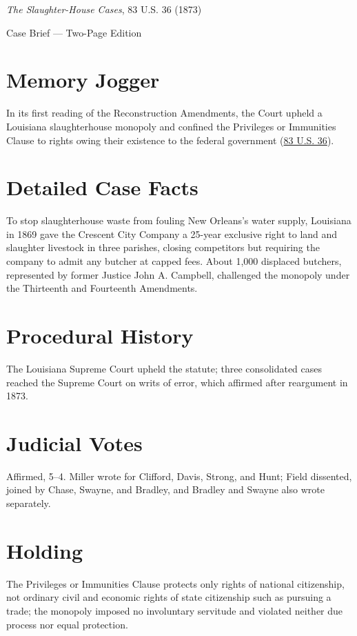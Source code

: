 \documentclass[12pt]{article}
\begin{document}
\begin{center}
{\LARGE \textit{The Slaughter-House Cases}, 83 U.S. 36 (1873)\par}
\vspace{0.5em}
{\large Case Brief --- Two-Page Edition\par}
\end{center}

\section{Memory Jogger}
In its first reading of the Reconstruction Amendments, the Court upheld a Louisiana slaughterhouse monopoly and confined the Privileges or Immunities Clause to rights owing their existence to the federal government (\href{https://www.courtlistener.com/opinion/88661/butchers-benevolent-assn-v-crescent-city-live-stock-landing/}{83 U.S. 36}).

\section{Detailed Case Facts}
To stop slaughterhouse waste from fouling New Orleans's water supply, Louisiana in 1869 gave the Crescent City Company a 25-year exclusive right to land and slaughter livestock in three parishes, closing competitors but requiring the company to admit any butcher at capped fees. About 1,000 displaced butchers, represented by former Justice John A. Campbell, challenged the monopoly under the Thirteenth and Fourteenth Amendments.

\section{Procedural History}
The Louisiana Supreme Court upheld the statute; three consolidated cases reached the Supreme Court on writs of error, which affirmed after reargument in 1873.

\section{Judicial Votes}
Affirmed, 5--4. Miller wrote for Clifford, Davis, Strong, and Hunt; Field dissented, joined by Chase, Swayne, and Bradley, and Bradley and Swayne also wrote separately.

\section{Holding}
The Privileges or Immunities Clause protects only rights of national citizenship, not ordinary civil and economic rights of state citizenship such as pursuing a trade; the monopoly imposed no involuntary servitude and violated neither due process nor equal protection.
\end{document}
